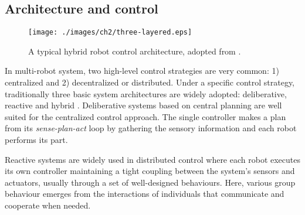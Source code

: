 \subsection*{Architecture and control}
\label{bg:mrs:arch}
\begin{figure}
\begin{center}
\texttt{[image: ./images/ch2/three-layered.eps]} %
\caption{A typical hybrid robot control architecture, adopted from \protect{}.} 
\label{fig:three-layer-arch}
\end{center}
\end{figure}
In multi-robot system, two high-level control strategies are very common: 1) centralized and 2) decentralized or distributed. Under a specific control strategy, traditionally three basic system architectures are widely adopted: deliberative, reactive and hybrid \cite{Arkin1998}. Deliberative systems based on central planning are well suited for the centralized control approach. The single controller makes a plan from its {\em sense-plan-act} loop by gathering the sensory information and each robot performs its part.

Reactive systems are widely used in distributed control where each robot executes its own controller maintaining a tight coupling between the system's sensors and actuators, usually through a set of well-designed behaviours. Here, various group behaviour emerges from the interactions of individuals that communicate and cooperate when needed. 

